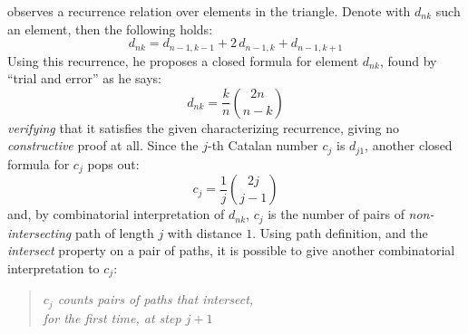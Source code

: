 \citeauthor{shapiro:1976} observes a recurrence relation over elements in the triangle.
Denote with $d_{nk}$ such an element, then the following holds:
\begin{displaymath}
    d_{nk}=d_{n-1,k-1}+2\,d_{n-1,k}+d_{n-1,k+1}
\end{displaymath}
Using this recurrence, he proposes a closed formula for element $d_{nk}$, found by 
``trial and error'' as he says:
\begin{displaymath}
    d_{nk}=\frac{k}{n}{{2n}\choose{n-k}}
\end{displaymath}
\emph{verifying} that it satisfies the given characterizing recurrence, giving
no \emph{constructive} proof at all. Since the $j$-th Catalan number $c_{j}$ is $d_{j1}$,
another closed formula for $c_{j}$ pops out:
\begin{displaymath}
    c_{j}=\frac{1}{j}{{2j}\choose{j-1}}
\end{displaymath}
and, by combinatorial interpretation of $d_{nk}$, $c_j$ is the number of pairs
of \emph{non-intersecting} path of length $j$ with distance $1$. Using path definition,
and the \emph{intersect} property on a pair of paths, it is possible to give another
combinatorial interpretation to $c_{j}$:
\begin{quote}
    \emph{$c_j$ counts pairs of paths that intersect, \\
    \indent for the \emph{first} time, at step $j+1$ }
\end{quote}
